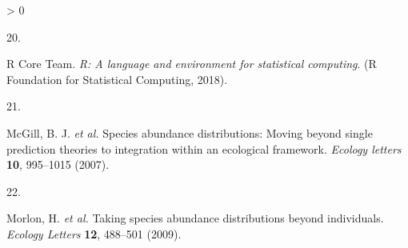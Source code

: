 \documentclass[
]{article}
\newlength{\cslhangindent}
\newlength{\csllabelwidth}
\newenvironment{CSLReferences}[2] %
 {%
  \setlength{\parindent}{0pt}
  \ifodd #1 \everypar{\setlength{\hangindent}{\cslhangindent}}\ignorespaces\fi
  \ifnum #2 > 0
  \setlength{\parskip}{#2\baselineskip}
  \fi
 }%
 {}
\newcommand{\CSLLeftMargin}[1]{\parbox[t]{\csllabelwidth}{#1}}
\newcommand{\CSLRightInline}[1]{\parbox[t]{\linewidth - \csllabelwidth}{#1}\break}
\begin{document}
\begin{CSLReferences}{0}{0}
\leavevmode\hypertarget{ref-rcore}{}%
\CSLLeftMargin{20. }
\CSLRightInline{R Core Team. \emph{R: A language and environment for
statistical computing}. (R Foundation for Statistical Computing, 2018).}

\leavevmode\hypertarget{ref-mcgill2007}{}%
\CSLLeftMargin{21. }
\CSLRightInline{McGill, B. J. \emph{et al.} Species abundance
distributions: Moving beyond single prediction theories to integration
within an ecological framework. \emph{Ecology letters} \textbf{10},
995--1015 (2007).}

\leavevmode\hypertarget{ref-morlon2009}{}%
\CSLLeftMargin{22. }
\CSLRightInline{Morlon, H. \emph{et al.} Taking species abundance
distributions beyond individuals. \emph{Ecology Letters} \textbf{12},
488--501 (2009).}

\end{CSLReferences}
\end{document}
